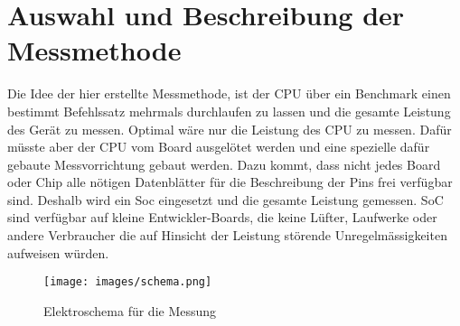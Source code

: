 \section{Auswahl und Beschreibung der Messmethode}
\label{chap:auswahl_beschreibung_methode}

Die Idee der hier erstellte Messmethode, ist der CPU über ein Benchmark einen bestimmt Befehlssatz mehrmals durchlaufen zu lassen und die gesamte Leistung des Gerät zu messen. Optimal wäre nur die Leistung des CPU zu messen. Dafür müsste aber der CPU vom Board ausgelötet werden und eine spezielle dafür gebaute Messvorrichtung gebaut werden. Dazu kommt, dass nicht jedes Board oder Chip alle nötigen Datenblätter für die Beschreibung der Pins frei verfügbar sind. Deshalb wird ein Soc eingesetzt und die gesamte Leistung gemessen. SoC sind verfügbar auf kleine Entwickler-Boards, die keine Lüfter, Laufwerke oder andere Verbraucher die  auf Hinsicht der Leistung störende Unregelmässigkeiten aufweisen würden.



\begin{wrapfigure}{r}{0.6\textwidth}
\centering
\texttt{[image: images/schema.png]}
\caption{Elektroschema für die Messung}
\label{fig:Elektroschema}
\end{wrapfigure}


